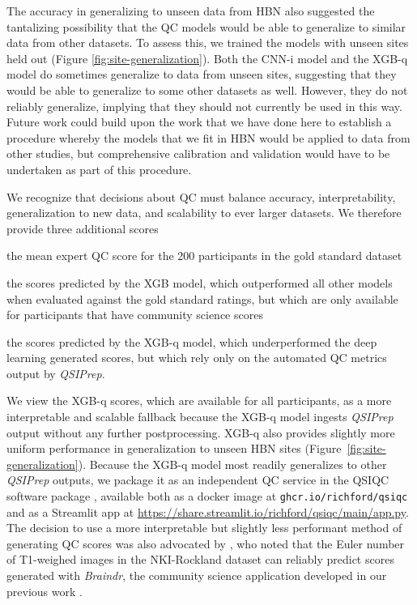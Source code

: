 \documentclass[fleqn,10pt,inline]{wlscirep}
\begin{document}
The accuracy in generalizing to unseen data from HBN also suggested the tantalizing possibility that the QC models would be able to generalize to similar data from other datasets. To assess this, we trained the models with unseen sites held out (Figure \ref{fig:site-generalization}). Both the CNN-i model and the XGB-q model do sometimes generalize to data from unseen sites, suggesting that they would be able to generalize to some other datasets as well. However, they do not reliably generalize, implying that they should not currently be used in this way. Future work could build upon the work that we have done here to establish a procedure whereby the models that we fit in HBN would be applied to data from other studies, but comprehensive calibration and validation would have to be undertaken as part of this procedure. 

We recognize that decisions about QC  must balance accuracy, interpretability, generalization to new data, and scalability to ever larger datasets. We therefore provide three additional scores
\begin{enumerate*}[%
    label=(\roman*),%
    before=\unskip{: },%
    itemjoin={{, }},%
    itemjoin*={{, and }}]
    \item the mean expert QC score for the 200 participants in the gold standard
    dataset
    \item the scores predicted by the XGB model, which outperformed all other models
    when evaluated against the gold standard ratings, but which are only available
    for participants that have community science scores
    \item the scores predicted by the XGB-q model, which underperformed the deep
    learning generated scores, but which rely only on the automated QC metrics
    output by \emph{QSIPrep}.
\end{enumerate*}
We view the XGB-q scores, which are available for all participants, as a more interpretable and scalable fallback because the XGB-q model ingests \emph{QSIPrep} output without any further postprocessing. XGB-q also provides slightly more uniform performance in generalization to unseen HBN sites (Figure~\ref{fig:site-generalization}). Because the XGB-q model most readily generalizes to other \emph{QSIPrep} outputs, we package it as an independent QC service in the QSIQC software package \cite{richiehalford2022qsiqc}, available both as a docker image at \texttt{ghcr.io/richford/qsiqc} and as a Streamlit app at \url{https://share.streamlit.io/richford/qsiqc/main/app.py}.
The decision to use a more interpretable but slightly less
performant method of generating QC scores was also advocated by
\cite{tobe2021longitudinal}, who noted that the Euler number of T1-weighed
images \cite{rosen2018quantitative} in the NKI-Rockland dataset can reliably predict scores generated with
\emph{Braindr}, the community science application developed in our previous work
\cite{keshavan2019-er}.
\end{document}
